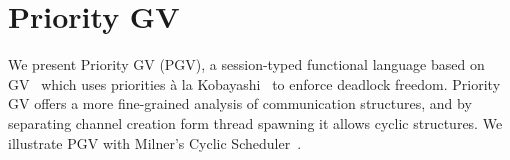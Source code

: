 \documentclass[main.tex]{subfiles}
\begin{document}
\section{Priority GV}\label{sec:pgv}

We present Priority GV (PGV), a session-typed functional language based on GV~\cite{wadler15,lindleymorris15} which uses priorities \`{a} la Kobayashi~\cite{kobayashi06,padovaninovara15} to enforce deadlock freedom.
Priority GV offers a more fine-grained analysis of communication structures, and by separating channel creation form thread spawning it allows cyclic structures. We illustrate PGV with Milner's Cyclic Scheduler~\cite{milner89}.
\end{document}
